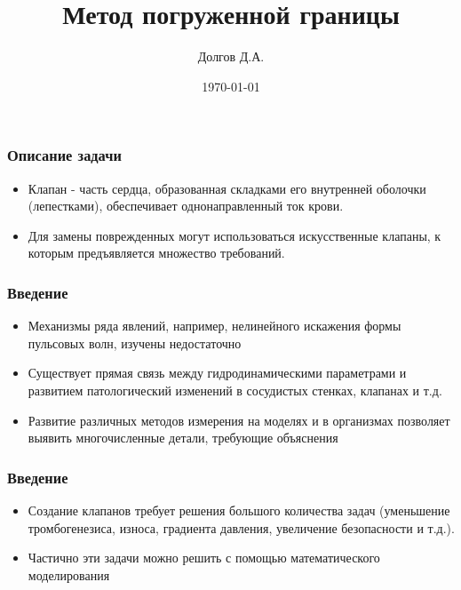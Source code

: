 \documentclass[14pt, notes]{beamer}
\title{Метод погруженной границы}
\date{\today}
\author{Долгов Д.А.}
\institute{Кемеровский Государственный Университет \\
    \vspace{0.7cm}
    \vspace{0.7cm}
}
\begin{document}
\maketitle

\begin{frame}
\frametitle{Описание задачи}
\begin{itemize}
	\item Клапан - часть сердца, образованная складками его внутренней оболочки (лепестками), обеспечивает однонаправленный ток крови.
	\item Для замены поврежденных могут использоваться искусственные клапаны, к которым предъявляется множество требований.
\end{itemize}
\end{frame}

\begin{frame}
\frametitle{Введение}
\begin{itemize}
    \item \alert<+>{Механизмы ряда явлений, например, нелинейного искажения формы пульсовых волн, изучены недостаточно}
    \item \alert<+>{Существует прямая связь между гидродинамическими параметрами и развитием патологический изменений в сосудистых стенках, клапанах и т.д.}
    \item \alert<+>{Развитие различных методов измерения на моделях и в организмах позволяет выявить многочисленные детали, требующие объяснения}
\end{itemize}
\end{frame}

\begin{frame}
\frametitle{Введение}
\begin{itemize}
	\item Создание клапанов требует решения большого количества задач (уменьшение тромбогенезиса, износа, градиента давления, увеличение безопасности и т.д.).
    \item Частично эти задачи можно решить с помощью математического моделирования
\end{itemize}
\end{frame}
\end{document}
